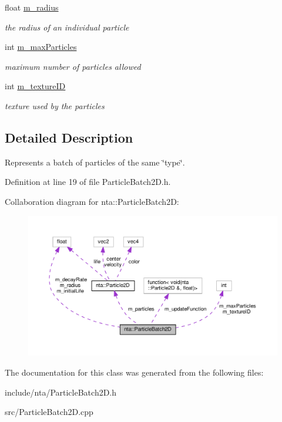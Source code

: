 \begin{DoxyCompactItemize}
float \hyperlink{classnta_1_1ParticleBatch2D_ac564b88da2f73d5692cbdec15478fe4d}{m\+\_\+radius}
\begin{DoxyCompactList}\small\item\em the radius of an individual particle \end{DoxyCompactList}\item 
\mbox{\label{classnta_1_1ParticleBatch2D_acf0dbc3bae31f962ed403daf06848948}} 
int \hyperlink{classnta_1_1ParticleBatch2D_acf0dbc3bae31f962ed403daf06848948}{m\+\_\+max\+Particles}
\begin{DoxyCompactList}\small\item\em maximum number of particles allowed \end{DoxyCompactList}\item 
\mbox{\label{classnta_1_1ParticleBatch2D_a73232a0481db52884b42c50deb456add}} 
int \hyperlink{classnta_1_1ParticleBatch2D_a73232a0481db52884b42c50deb456add}{m\+\_\+texture\+ID}
\begin{DoxyCompactList}\small\item\em texture used by the particles \end{DoxyCompactList}\end{DoxyCompactItemize}


\subsection{Detailed Description}
Represents a batch of particles of the same \char`\"{}type\char`\"{}. 

Definition at line 19 of file Particle\+Batch2\+D.\+h.



Collaboration diagram for nta\+:\+:Particle\+Batch2D\+:
\nopagebreak
\begin{figure}[H]
\begin{center}
\leavevmode
\includegraphics[width=350pt]{d4/d22/classnta_1_1ParticleBatch2D__coll__graph}
\end{center}
\end{figure}


The documentation for this class was generated from the following files\+:\begin{DoxyCompactItemize}
\item 
include/nta/Particle\+Batch2\+D.\+h\item 
src/Particle\+Batch2\+D.\+cpp\end{DoxyCompactItemize}

